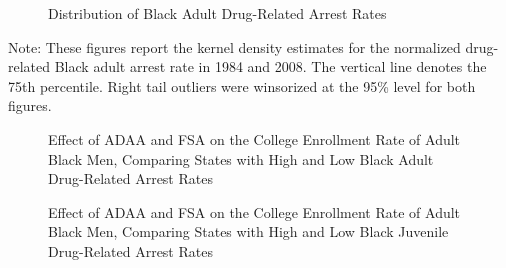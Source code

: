   \clearpage

  \begin{figure}[h]
    \centering
    \caption{Distribution of Black Adult Drug-Related Arrest Rates}%
    \qquad
    \label{fig:density_jb}%
  \end{figure}
  \begin{footnotesize}
    \noindent Note: These figures report the kernel density estimates for the normalized drug-related Black adult arrest rate in 1984 and 2008. The vertical line denotes the 75th percentile. Right tail outliers were winsorized at the 95\% level for both figures.
  \end{footnotesize}

\clearpage 

\begin{figure}[h]
  \centering
  \caption{Effect of ADAA and FSA on the College Enrollment Rate of Adult Black Men, Comparing States with High and Low Black Adult Drug-Related Arrest Rates}%
  \qquad
  \label{fig:reducedform_ab}%
\end{figure}
\begin{figure}[h]
  \centering
  \caption{Effect of ADAA and FSA on the College Enrollment Rate of Adult Black Men, Comparing States with High and Low Black Juvenile Drug-Related Arrest Rates}%
  \qquad
  \label{fig:reducedform_jb}%
\end{figure}
